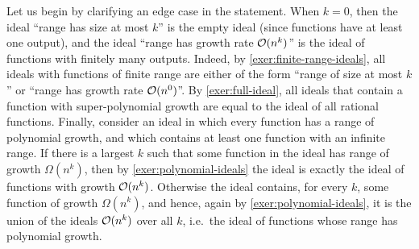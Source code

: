 {Let us begin by clarifying an edge case in the statement. When $k=0$, then the ideal ``range has size at most $k$'' is the empty ideal (since functions have at least one output), and the ideal ``range has growth rate ${\mathcal O}(n^k)$'' is the ideal of functions with finitely many outputs.  Indeed, by \cref{exer:finite-range-ideals}, all ideals with functions of finite range are either of the form ``range of size at most $k$'' or ``range has growth rate ${\mathcal O}(n^0)$''. By \cref{exer:full-ideal}, all ideals that contain a function with super-polynomial growth are equal to the ideal of all rational functions. Finally, consider an ideal in which every function has a range of polynomial growth, and which contains at least one function with an infinite range. If there is a largest $k$ such that some function in the ideal has range of growth $\Omega(n^k)$, then by \cref{exer:polynomial-ideals} the ideal is exactly the ideal of functions with growth ${\mathcal O}(n^k)$. Otherwise the ideal contains, for every $k$, some function of growth $\Omega(n^k)$, and hence, again by \cref{exer:polynomial-ideals}, it is the union of the ideals ${\mathcal O}(n^k)$ over all $k$, i.e.~the ideal of functions whose range has polynomial growth. 
}


